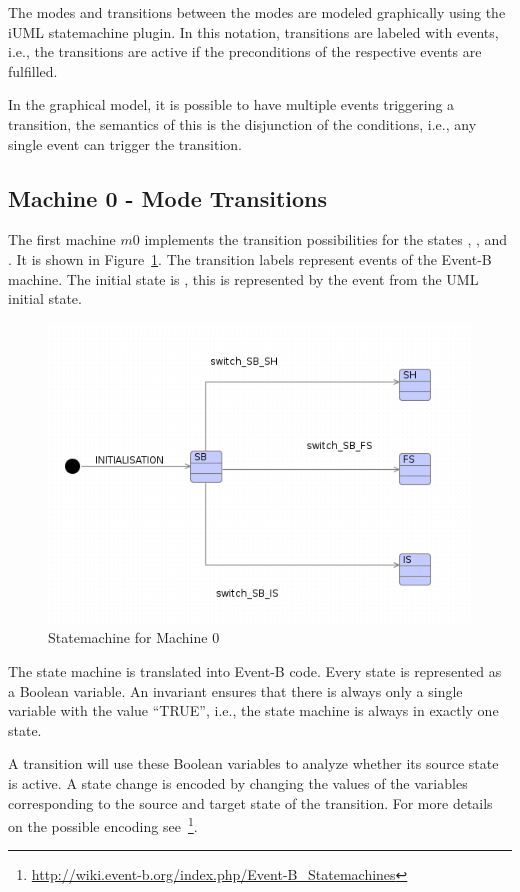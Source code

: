 \documentclass{template/openetcs_article}
\begin{document}
The modes and transitions between  the modes are modeled graphically using the
iUML statemachine plugin. In this notation, transitions are labeled with events,
i.e., the transitions are active if the preconditions of the respective events
are fulfilled.

In the graphical model, it is possible to have multiple events triggering a
transition, the semantics of this is the disjunction of the conditions, i.e.,
any single event can trigger the transition.

\subsection{Machine 0 - Mode Transitions}
\label{sec:machine-0-mode}

The first machine $m0$ implements the transition possibilities for the states
, ,  and . It is shown in
Figure~\ref{fig:statemachine-m0}. The transition labels represent events of the
Event-B machine. The initial state is , this is represented by the
 event from the UML initial state.

\begin{figure}[ht]
  \centering
  \includegraphics[width=.75\textwidth]{statechart1}
  \caption{Statemachine for Machine 0}
  \label{fig:statemachine-m0}
\end{figure}

The state machine is translated into Event-B code. Every state is represented as
a Boolean variable. An invariant ensures that there is always only a single
variable with the value ``TRUE'', i.e., the state machine is always in exactly
one state.

A transition will use these Boolean variables to analyze whether its source
state is active. A state change is encoded by changing the values of the
variables corresponding to the source and target state of the transition. For
more details on the possible encoding
see~\footnote{\url{http://wiki.event-b.org/index.php/Event-B_Statemachines}}.
\end{document}
